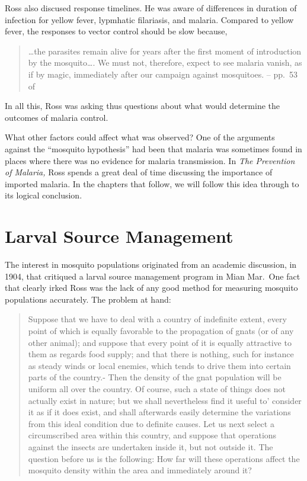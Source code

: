 \documentclass[
]{book}
\begin{document}
Ross also discused response timelines. He was aware of differences in duration of infection for yellow fever, lypmhatic filariasis, and malaria. Compared to yellow fever, the responses to vector control should be slow because,

\begin{quote}
\ldots the parasites remain alive for years after the first moment of introduction by the mosquito\ldots. We must not, therefore, expect to see malaria vanish, as if by magic, immediately after our campaign against mosquitoes. -- pp.~53 of \autocite{RossR1902MosquitoBrigades}
\end{quote}

In all this, Ross was asking thus questions about what would determine the outcomes of malaria control.

What other factors could affect what was observed? One of the arguments against the ``mosquito hypothesis'' had been that malaria was sometimes found in places where there was no evidence for malaria transmission. In \emph{The Prevention of Malaria,} Ross spends a great deal of time discussing the importance of imported malaria. In the chapters that follow, we will follow this idea through to its logical conclusion.

\section{Larval Source Management}\label{larval-source-management}

The interest in mosquito populations originated from an academic discussion, in 1904, that critiqued a larval source management program in Mian Mar.~One fact that clearly irked Ross was the lack of any good method for measuring mosquito populations accurately. The problem at hand:

\begin{quote}
Suppose that we have to deal with a country of indefinite extent, every point of which is equally favorable to the propagation of gnats (or of any other animal); and suppose that every point of it is equally attractive to them as regards food supply; and that there is nothing, such for instance as steady winds or local enemies, which tends to drive them into certain parts of the country.- Then the density of the gnat population will be uniform all over the country. Of course, such a state of things does not actually exist in nature; but we shall nevertheless find it useful to' consider it as if it does exist, and shall afterwards easily determine the variations from this ideal condition due to definite causes. Let us next select a circumscribed area within this country, and suppose that operations against the insects are undertaken inside it, but not outside it. The question before us is the following: How far will these operations affect the mosquito density within the area and immediately around it?
\end{quote}
\end{document}
